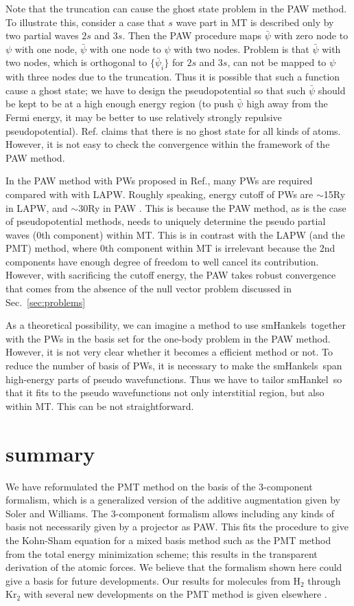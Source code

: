 \documentclass[twocolumn,showpacs,preprintnumbers,amsmath,amssymb,floatfix]{revtex4-1}
\newcommand{\refsec}[1]{\mbox{Sec.~\!\ref{#1}}}
\def\smh{smHankel}
\def\smhs{smHankels}
\begin{document}
Note that the truncation can cause the ghost state problem in the PAW method.
To illustrate this, consider a case that $s$ wave part in MT is described
only by two partial waves $2s$ and $3s$. Then the PAW procedure maps $\bar{\psi}$ with zero node to 
$\psi$ with one node, $\bar{\psi}$ with one node to $\psi$ with two nodes. 
Problem is that $\bar{\psi}$ with two nodes, which is orthogonal to $\{\bar{\psi}_i\}$ for $2s$ and $3s$,
can not be mapped to $\psi$ with three nodes due to the truncation. 
Thus it is possible that such a function cause a ghost state;
we have to design the pseudopotential so that such $\bar{\psi}$ should be
kept to be at a high enough energy region (to push $\bar{\psi}$ high away from the
Fermi energy, it may be better to use relatively strongly repulsive pseudopotential). 
Ref.\cite{kresse99} claims that there is no
ghost state for all kinds of atoms. However, it is not easy
to check the convergence within the framework of the PAW method.

In the PAW method with PWs proposed in Ref.\cite{kresse99}, many PWs are required
compared with with LAPW. Roughly speaking, energy cutoff of PWs are
$\sim$15Ry in LAPW, and $\sim$30Ry in PAW \cite{filippi94,kresse99}.
This is because the PAW method, as is the case of pseudopotential methods,
needs to uniquely determine the pseudo partial waves (0th component) within MT.
This is in contrast with the LAPW (and the PMT) method, 
where 0th component within MT is irrelevant because 
the 2nd components have enough degree of freedom to well cancel its contribution.
However, with sacrificing the cutoff energy,
the PAW takes robust convergence that comes from the absence of the 
null vector problem discussed in \refsec{sec:problems}

As a theoretical possibility, we can imagine a method to 
use \smhs\ together with the PWs in the basis set
for the one-body problem in the PAW method.
However, it is not very clear whether it becomes 
a efficient method or not. To reduce the number of basis of PWs, it is
necessary to make the \smhs\ span high-energy parts of pseudo
wavefunctions. Thus we have to tailor \smh\ so that it fits to the pseudo
wavefunctions not only interstitial region, but also within MT. 
This can be not straightforward.


\section{summary}
We have reformulated the PMT method on the basis of the 3-component
formalism, which is a generalized version of the additive augmentation 
given by Soler and Williams. The 3-component formalism
allows including any kinds of basis not necessarily given by a
projector as PAW. This fits the procedure to give the Kohn-Sham equation for a mixed basis method such 
as the PMT method from the total energy minimization scheme; this
results in the transparent derivation of the atomic forces.
We believe that the formalism shown here could give a basis for future developments.
Our results for molecules from H$_2$ through Kr$_2$ 
with several new developments on the PMT method 
is given elsewhere \cite{kotani_linearized_2013}.
\end{document}
